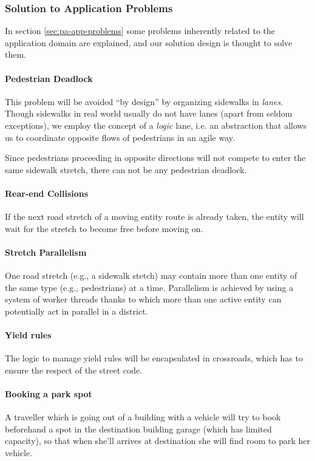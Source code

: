 
\subsubsection{Solution to Application Problems}

In section \ref{sec:pa-app-problems} some problems inherently related to the
application domain are explained, and our solution design is thought to solve
them.

\paragraph{Pedestrian Deadlock}
This problem will be avoided ``by design'' by organizing sidewalks in
\textit{lanes}. Though sidewalks in real world usually do not have lanes (apart
from seldom exceptions), we employ the concept of a \textit{logic} lane, i.e.
an abstraction that allows us to coordinate opposite flows of pedestrians in an
agile way.

Since pedestrians proceeding in opposite directions will not compete to enter
the same sidewalk stretch, there can not be any pedestrian deadlock.

\paragraph{Rear-end Collisions}
If the next road stretch of a moving entity route is already taken, the entity
will wait for the stretch to become free before moving on.

\paragraph{Stretch Parallelism}
One road stretch (e.g., a sidewalk stetch) may contain more than one entity of
the same type (e.g., pedestrians) at a time.
Parallelism is achieved by using a system of worker threads thanks to which
more than one active entity can potentially act in parallel in a district.

\paragraph{Yield rules}
The logic to manage yield rules will be encapsulated in crossroads, which has
to ensure the respect of the street code.

\paragraph{Booking a park spot}
A traveller which is going out of a building with a vehicle will try to book
beforehand a spot in the destination building garage (which has limited
capacity), so that when she'll arrives at destination she will find room to
park her vehicle.

